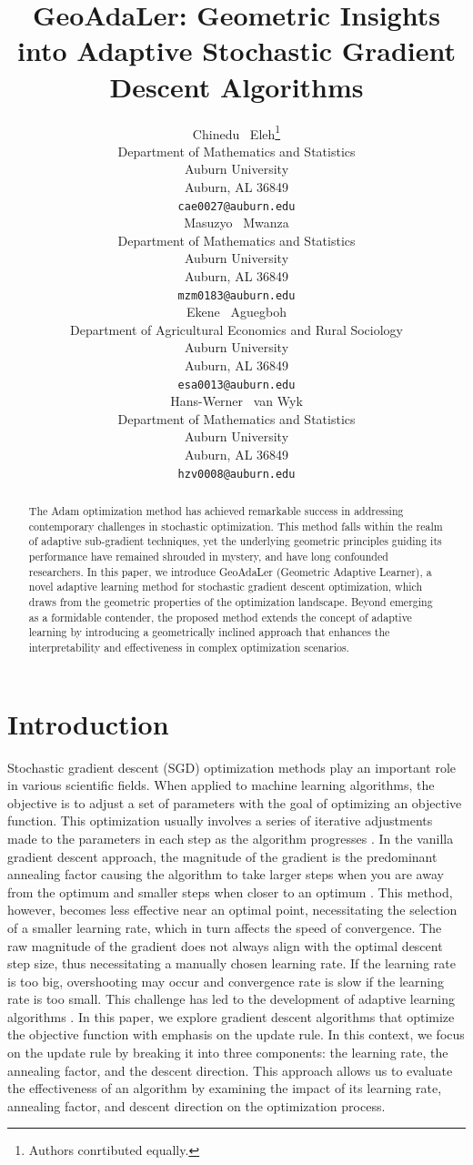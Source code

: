 \documentclass{article}
\title{GeoAdaLer: Geometric Insights into Adaptive Stochastic Gradient Descent Algorithms}
\author{
  Chinedu ~Eleh\thanks{Authors conrtibuted equally.} \\
  Department of Mathematics and Statistics\\
  Auburn University\\
  Auburn, AL 36849 \\
  \texttt{cae0027@auburn.edu} \\
  \And
  Masuzyo ~Mwanza\samethanks \\
  Department of Mathematics and Statistics\\
  Auburn University\\
  Auburn, AL 36849 \\
  \texttt{mzm0183@auburn.edu} \\
  \AND
  Ekene ~Aguegboh \\
  Department of Agricultural Economics and Rural Sociology\\
  Auburn University\\
  Auburn, AL 36849 \\
  \texttt{esa0013@auburn.edu} \\
  \And
  Hans-Werner ~van Wyk \\
  Department of Mathematics and Statistics\\
  Auburn University\\
  Auburn, AL 36849 \\
  \texttt{hzv0008@auburn.edu} \\
}
\begin{document}
\maketitle


\begin{abstract}
  The Adam optimization method has achieved remarkable success in addressing contemporary challenges in stochastic optimization. This method falls within the realm of adaptive sub-gradient techniques, yet the underlying geometric principles guiding its performance have remained shrouded in mystery, and have long confounded researchers. In this paper, we introduce GeoAdaLer (Geometric Adaptive Learner), a novel adaptive learning method for stochastic gradient descent optimization, which draws from the geometric properties of the optimization landscape. Beyond emerging as a formidable contender, the proposed method extends the concept of adaptive learning by introducing a geometrically inclined approach that enhances the interpretability and effectiveness in complex optimization scenarios.
\end{abstract}

\section{Introduction}
Stochastic gradient descent (SGD) optimization methods \citep{robbins1951stochastic, rumelhart1986learning} play an important role in various scientific fields. When applied to machine learning algorithms, the objective is to adjust a set of parameters with the goal of optimizing an objective function.  This optimization usually involves a series of iterative adjustments made to the parameters in each step as the algorithm progresses \citep{kingma2014adam}.  In the vanilla gradient descent approach, the magnitude of the gradient is the predominant annealing factor causing the algorithm to take larger steps when you are away from the optimum and smaller steps when closer to an optimum \citep{ruder_overview_2017}. This method, however, becomes less effective near an optimal point, necessitating the selection of a smaller learning rate, which in turn affects the speed of convergence. The raw magnitude of the gradient does not always align with the optimal descent step size, thus necessitating a manually chosen learning rate. If the learning rate is too big, overshooting may occur and convergence rate is slow if the learning rate is too small. This challenge has led to the development of adaptive learning algorithms \citep{nar2018step}. In this paper, we explore gradient descent algorithms that optimize the objective function with emphasis on the update rule. In this context, we focus on the update rule by breaking it into three components: the learning rate, the annealing factor, and the descent direction. This approach allows us to evaluate the effectiveness of an algorithm by examining the impact of its learning rate, annealing factor, and descent direction on the optimization process.
\end{document}
